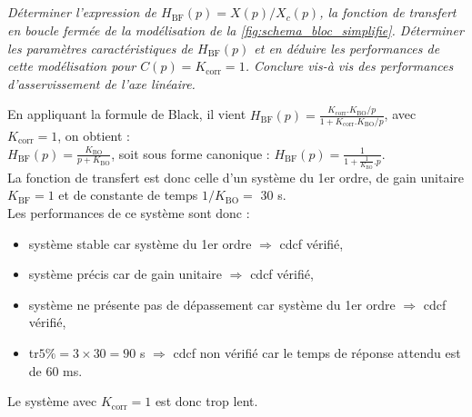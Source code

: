 \begin{multicols}{2}
\begin{center}
\end{center}

\fi


\subparagraph{}\textit{Déterminer l'expression de $H_{\text{BF}}(p)= X(p)/X_c(p)$, la fonction de transfert en boucle fermée de la modélisation de la \ref{fig:schema_bloc_simplifie}. Déterminer les paramètres caractéristiques de $H_{\text{BF}}(p)$ et en déduire les performances de cette  modélisation pour $C(p) = K_{\text{corr}} = 1$. Conclure vis-à vis des performances d'asservissement de l'axe linéaire.}

\ifprof
\begin{corrige}
En appliquant la formule de Black, il vient $H_{\text{BF}}(p)= \frac{K_{\text{corr}}.K_{\text{BO}}/p}{1+K_{\text{corr}}.K_{\text{BO}}/p}$, avec $K_{\text{corr}} = 1$, on obtient :\\
$H_{\text{BF}}(p)= \frac{K_{\text{BO}}}{p+K_{\text{BO}}}$, soit sous forme canonique : $H_{\text{BF}}(p)= \frac{1}{1+\frac{1}{K_{\text{BO}}}.p}$.\\
La fonction de transfert est donc celle d'un système du 1er ordre, de gain unitaire $K_{\text{BF}}=1$ et de constante de temps $1/K_{\text{BO}} =$ 30 s.\\
Les performances de ce système sont donc :
\begin{itemize}
\item système stable car système du 1er ordre $ \Rightarrow $ cdcf vérifié,
\item système précis car de gain unitaire $ \Rightarrow $ cdcf vérifié,
\item système ne présente pas de dépassement car système du 1er ordre $ \Rightarrow $ cdcf vérifié,
\item tr$5\% = 3 \times 30 = 90$ s $ \Rightarrow $ cdcf non vérifié car le temps de réponse attendu est de 60 ms.
\end{itemize}
Le système avec $K_{\text{corr}} = 1$ est donc trop lent.
\end{corrige}
\fi


\end{multicols}
